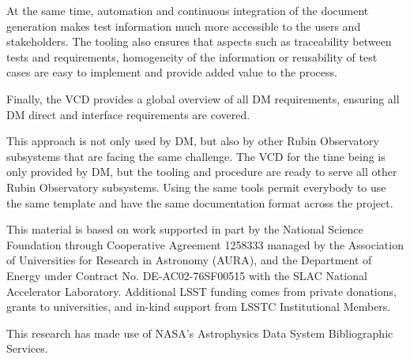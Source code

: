 At the same time, automation and continuous integration of the document generation makes test information
much more accessible to the users and stakeholders.
The tooling also ensures that aspects such as traceability between tests and requirements, homogeneity of the information
or reusability of test cases are easy to implement and provide added value to the process.

Finally, the VCD provides a global overview of all DM requirements, ensuring all DM direct and interface requirements are covered.

This approach is not only used by DM, but also by other Rubin Observatory subsystems that are facing the same challenge.
The VCD for the time being is only provided by DM, but the tooling and procedure are ready to serve all other Rubin Observatory subsystems.
Using the same tools permit everybody to use the same template and have the same documentation format across the project.


\acknowledgments
This material is based on work supported in part by the  {National Science Foundation} through Cooperative Agreement 1258333 managed by the  {Association of Universities for Research in Astronomy} ({AURA}), and the  {Department of Energy} under  {Contract} No.  {DE}-AC02-76SF00515 with the  {SLAC} National Accelerator Laboratory. Additional LSST funding comes from private donations, grants to universities, and in-kind support from LSSTC Institutional Members.

This research has made use of  NASA's Astrophysics Data System Bibliographic Services.
